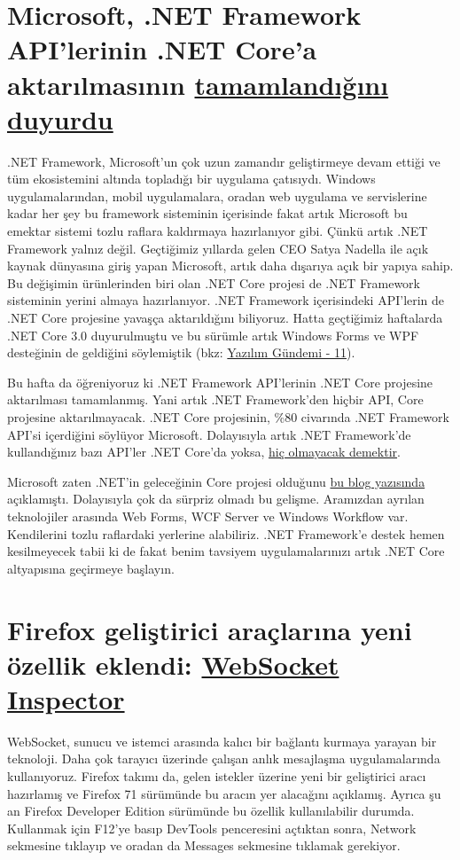 \documentclass[11pt]{article}
\begin{document}
\section{Microsoft, .NET Framework API'lerinin .NET Core'a aktarılmasının \href{https://github.com/dotnet/announcements/issues/130}{tamamlandığını duyurdu}}
\label{sec:orga4c7369}
.NET Framework, Microsoft'un çok uzun zamandır geliştirmeye devam ettiği ve tüm
ekosistemini altında topladığı bir uygulama çatısıydı. Windows
uygulamalarından, mobil uygulamalara, oradan web uygulama ve servislerine kadar
her şey bu framework sisteminin içerisinde fakat artık Microsoft bu emektar
sistemi tozlu raflara kaldırmaya hazırlanıyor gibi. Çünkü artık .NET Framework
yalnız değil. Geçtiğimiz yıllarda gelen CEO Satya Nadella ile açık kaynak
dünyasına giriş yapan Microsoft, artık daha dışarıya açık bir yapıya sahip. Bu
değişimin ürünlerinden biri olan .NET Core projesi de .NET Framework sisteminin
yerini almaya hazırlanıyor. .NET Framework içerisindeki API'lerin de .NET Core
projesine yavaşça aktarıldığını biliyoruz. Hatta geçtiğimiz haftalarda .NET
Core 3.0 duyurulmuştu ve bu sürümle artık Windows Forms ve WPF desteğinin de
geldiğini söylemiştik (bkz: \href{../11/yazilim-gundemi-11.pdf}{Yazılım Gündemi - 11}).

Bu hafta da öğreniyoruz ki .NET Framework API'lerinin .NET Core projesine
aktarılması tamamlanmış. Yani artık .NET Framework'den hiçbir API, Core
projesine aktarılmayacak. .NET Core projesinin, \%80 civarında .NET Framework
API'si içerdiğini söylüyor Microsoft. Dolayısıyla artık .NET Framework'de
kullandığınız bazı API'ler .NET Core'da yoksa, \href{https://www.theregister.co.uk/2019/10/15/net\_framework\_port\_end/}{hiç olmayacak demektir}.

Microsoft zaten .NET'in geleceğinin Core projesi olduğunu \href{https://devblogs.microsoft.com/dotnet/net-core-is-the-future-of-net/}{bu blog yazısında}
açıklamıştı. Dolayısıyla çok da sürpriz olmadı bu gelişme. Aramızdan ayrılan
teknolojiler arasında Web Forms, WCF Server ve Windows Workflow var.
Kendilerini tozlu raflardaki yerlerine alabiliriz. .NET Framework'e destek
hemen kesilmeyecek tabii ki de fakat benim tavsiyem uygulamalarınızı artık .NET
Core altyapısına geçirmeye başlayın.
\section{Firefox geliştirici araçlarına yeni özellik eklendi: \href{https://hacks.mozilla.org/2019/10/firefoxs-new-websocket-inspector/}{WebSocket Inspector}}
\label{sec:org3e9b634}
WebSocket, sunucu ve istemci arasında kalıcı bir bağlantı kurmaya yarayan bir
teknoloji. Daha çok tarayıcı üzerinde çalışan anlık mesajlaşma uygulamalarında
kullanıyoruz. Firefox takımı da, gelen istekler üzerine yeni bir geliştirici
aracı hazırlamış ve Firefox 71 sürümünde bu aracın yer alacağını açıklamış.
Ayrıca şu an Firefox Developer Edition sürümünde bu özellik kullanılabilir
durumda. Kullanmak için F12'ye basıp DevTools penceresini açtıktan sonra,
Network sekmesine tıklayıp ve oradan da Messages sekmesine tıklamak gerekiyor.
\end{document}
